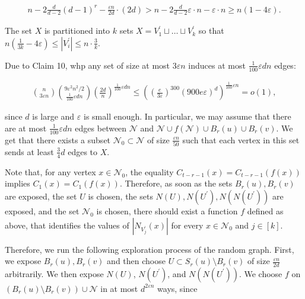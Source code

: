 \[\begin{gathered}
n-2\frac{d}{d-2}(d-1)^{r}-\frac{\varepsilon n}{2d}\cdot(2d)>n-2\frac{d}{d-2}\varepsilon\cdot n-\varepsilon\cdot n\geq n(1-4\varepsilon).
\end{gathered}\]


The set $X$ is partitioned into $k$ sets $X=V^{\prime}_{1}\sqcup\ldots\sqcup V^{\prime}_{k}$ so that $n(\frac{1}{3k}-4\varepsilon)\leq|V^{\prime}_{i}|\leq n\cdot\frac{3}{k}$.\par




Due to Claim 10, whp any set of size at most $3\varepsilon n$ induces at most $\frac{1}{100}\varepsilon dn$ edges:\par


\[\begin{gathered}
{n\choose 3\varepsilon n}{9\varepsilon^{2}n^{2}/2\choose\frac{1}{100}\varepsilon dn}\left(\frac{2d}{n}\right)^{\frac{1}{100}\varepsilon dn}\leq\left(\left(\frac{e}{3\varepsilon}\right)^{300}\left(900e\varepsilon\right)^{d}\right)^{\frac{1}{100}\varepsilon n}=o(1),
\end{gathered}\]


since $d$ is large and $\varepsilon$ is small enough. In particular, we may assume that there are at most $\frac{1}{100}\varepsilon dn$ edges between $\mathcal{N}$ and $\mathcal{N}\cup f(\mathcal{N})\cup B_{r}(u)\cup B_{r}(v)$. We get that there exists a subset $\mathcal{N}_{0}\subset\mathcal{N}$ of size $\frac{\varepsilon n}{50}$ such that each vertex in this set sends at least $\frac{3}{4}d$ edges to $X$.\par




Note that, for any vertex $x\in\mathcal{N}_{0}$, the equality $C_{t-r-1}(x)=C_{t-r-1}(f(x))$ implies $C_{1}(x)=C_{1}(f(x))$. Therefore, as soon as the sets $B_{r}(u),B_{r}(v)$ are exposed, the set $U$ is chosen, the sets $N(U),N(U^{\prime}),N(N(U^{\prime}))$ are exposed, and the set $\mathcal{N}_{0}$ is chosen, there should exist a function $f$ defined as above, that identifies the values of $|N_{V^{\prime}_{j}}(x)|$ for every $x\in\mathcal{N}_{0}$ and $j\in[k]$.\par




Therefore, we run the following exploration process of the random graph. First, we expose $B_{r}(u),B_{r}(v)$ and then choose $U\subset S_{r}(u)\setminus B_{r}(v)$ of size $\frac{\varepsilon n}{2d}$ arbitrarily. We then expose $N(U)$, $N(U^{\prime})$, and $N(N(U^{\prime}))$. We choose $f$ on $(B_{r}(u)\setminus B_{r}(v))\cup\mathcal{N}$ in at most $d^{2\varepsilon n}$ ways, since\par


